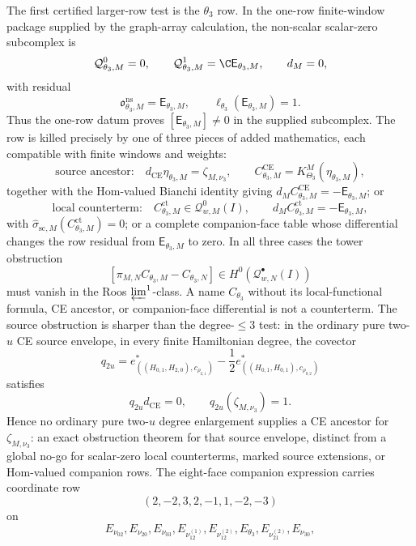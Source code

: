 \begin{enumerate}
  The first certified larger-row test is the \(\theta_3\) row.  In the
  one-row finite-window package supplied by the graph-array
  calculation, the non-scalar scalar-zero subcomplex is
  \[
    \mathcal Q^0_{\theta_3,M}=0,\qquad
    \mathcal Q^1_{\theta_3,M}
      =\C\mathsf E_{\theta_3,M},\qquad d_M=0,
  \]
  with residual
  \[
    \mathfrak o^{\mathrm{ns}}_{\theta_3,M}
      =\mathsf E_{\theta_3,M},\qquad
    \ell_{\theta_3}(\mathsf E_{\theta_3,M})=1 .
  \]
  Thus the one-row datum proves
  \([\mathsf E_{\theta_3,M}]\ne0\) in the supplied subcomplex.
  The row is killed precisely by one of three pieces of added
  mathematics, each compatible with finite windows and weights:
  \[
    \text{source ancestor:}\quad
    d_{\mathrm{CE}}\eta_{\theta_3,M}=\zeta_{M,\nu_3},\qquad
    C^{\mathrm{CE}}_{\theta_3,M}=K^M_{\Theta_3}(\eta_{\theta_3,M}),
  \]
  together with the Hom-valued Bianchi identity giving
  \(d_M C^{\mathrm{CE}}_{\theta_3,M}=-\mathsf E_{\theta_3,M}\);
  or
  \[
    \text{local counterterm:}\quad
    C^{\mathrm{ct}}_{\theta_3,M}\in\mathcal Q^0_{w,M}(I),\qquad
    d_M C^{\mathrm{ct}}_{\theta_3,M}=-\mathsf E_{\theta_3,M},
  \]
  with \(\widehat\sigma_{\mathrm{sc},M}(C^{\mathrm{ct}}_{\theta_3,M})=0\);
  or a complete companion-face table whose differential changes the
  row residual from \(\mathsf E_{\theta_3,M}\) to zero.  In all three
  cases the tower obstruction
  \[
    [\pi_{M,N}C_{\theta_3,M}-C_{\theta_3,N}]
      \in H^0(\mathcal Q^\bullet_{w,N}(I))
  \]
  must vanish in the Roos \(\varprojlim^1\)-class.  A name
  \(C_{\theta_3}\) without its local-functional formula, CE ancestor,
  or companion-face differential is not a counterterm.  The source
  obstruction is sharper than the degree-\(\le3\) test: in the
  ordinary pure two-\(u\) CE source envelope, in every finite
  Hamiltonian degree, the covector
  \[
    q_{2u}
    =
    e^*_{((H_{0,1},H_{2,0}),c_{\rho_{2,1}})}
    -\frac12
    e^*_{((H_{0,1},H_{0,1}),c_{\rho_{0,2}})}
  \]
  satisfies
  \[
    q_{2u}d_{\mathrm{CE}}=0,\qquad
    q_{2u}(\zeta_{M,\nu_3})=1.
  \]
  Hence no ordinary pure two-\(u\) degree enlargement supplies a CE
  ancestor for \(\zeta_{M,\nu_3}\): an exact obstruction theorem for
  that source envelope, distinct from a global no-go for scalar-zero
  local counterterms, marked source extensions, or Hom-valued
  companion rows.  The eight-face companion expression carries
  coordinate row
  \[
    (2,-2,3,2,-1,1,-2,-3)
  \]
  on
  \[
    E_{\nu_{02}},E_{\nu_{20}},E_{\nu_{03}},
    E_{\nu_{12}^{(1)}},E_{\nu_{12}^{(2)}},
    E_{\theta_3},E_{\nu_{21}^{(2)}},E_{\nu_{30}},
  \]

\end{enumerate}
